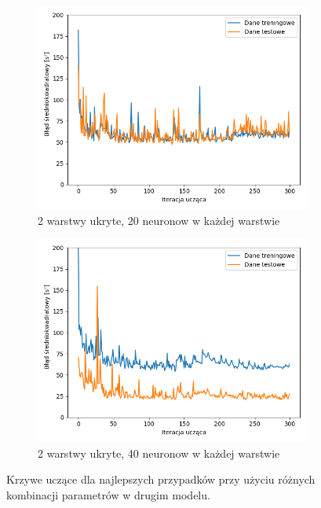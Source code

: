 \documentclass[12pt]{aghdpl}
\begin{document}
\begin{figure}[h]
\begin{center}
		 	\begin{subfigure}{.8\linewidth}
		 		\includegraphics[width =\linewidth]{wykresy/4_zwiekszenie_stopnia_skomplikowania_modelu/2_warstwy_20_neuronow_wykres_uczenia.png}
		 		\caption{2 warstwy ukryte, 20 neuronow w każdej warstwie}
		 	\end{subfigure}
		 	\begin{subfigure}{.8\linewidth}
		 		\includegraphics[width =\linewidth]{wykresy/4_zwiekszenie_stopnia_skomplikowania_modelu/2_warstwy_40_neuronow_wykres_uczenia.png}
		 		\caption{2 warstwy ukryte, 40 neuronow w każdej warstwie}
		 	\end{subfigure}
		 	\end{center}
	 	
 			\caption{Krzywe uczące dla najlepszych przypadków przy użyciu różnych kombinacji parametrów w drugim modelu.}
			\label{fig: drugi_model_kombinacje_parametrow_wykresy_uczenia}
		\end{figure}
		
\end{document}
